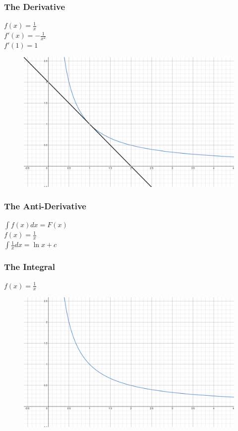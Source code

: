\documentclass{beamer}
\begin{document}
    \begin{frame}
        \frametitle{The Derivative}
        \(f(x)=\frac{1}{x}\)\\
        \(f'(x)=-\frac{1}{x^2}\)\\
        \(f'(1)=1\)\\
        \begin{figure}
            \centering
            \includegraphics[width=0.6\linewidth]{include/images/invx_3.png}
        \end{figure}
    \end{frame}

    \begin{frame}
        \frametitle{The Anti-Derivative}
        \(\int f(x)dx = F(x)\)\\[12pt] \pause
        \(f(x)=\frac{1}{x}\)\\[12pt]
        \(\int \frac{1}{x} dx = \ln x +c\)
    \end{frame}

    \begin{frame}
        \frametitle{The Integral}
        \(f(x)=\frac{1}{x}\)\\[26pt]
        \begin{figure}
            \centering
            \includegraphics[width=0.6\linewidth]{include/images/invx_2.png}
        \end{figure}
    \end{frame}
\end{document}
